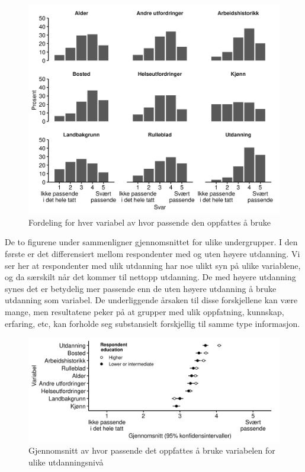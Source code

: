 \documentclass[
  12pt,
  a4paper, 12pt]{article}
\begin{document}
\begin{figure}

{\centering \includegraphics[width=0.9\linewidth]{figs/png/fig_vars_hist} 

}

\caption{Fordeling for hver variabel av hvor passende den oppfattes å bruke}\label{fig:unnamed-chunk-26}
\end{figure}

De to figurene under sammenligner gjennomsnittet for ulike undergrupper. I den første er det differensiert mellom respondenter med og uten høyere utdanning. Vi ser her at respondenter med ulik utdanning har noe ulikt syn på ulike variablene, og da særskilt når det kommer til nettopp utdanning. De med høyere utdanning synes det er betydelig mer passende enn de uten høyere utdanning å bruke utdanning som variabel. De underliggende årsaken til disse forskjellene kan være mange, men resultatene peker på at grupper med ulik oppfatning, kunnskap, erfaring, etc, kan forholde seg substansielt forskjellig til samme type informasjon.

\begin{figure}

{\centering \includegraphics[width=0.9\linewidth]{figs/png/fig_vars_avg_utd} 

}

\caption{Gjennomsnitt av hvor passende det oppfattes å bruke variabelen for ulike utdanningsnivå}\label{fig:unnamed-chunk-27}
\end{figure}
\end{document}
